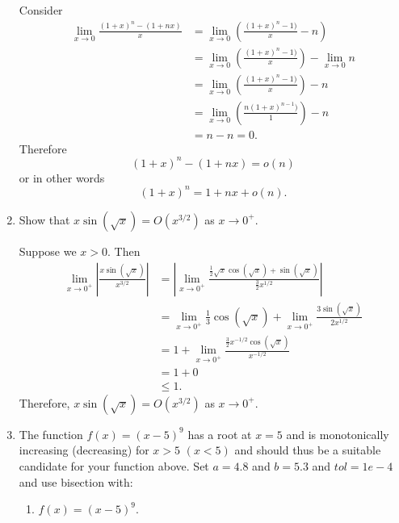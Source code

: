 \documentclass[a4paper,10pt]{article}
\newcommand{\abs}[1]{\left| #1 \right|}
\begin{document}
\begin{enumerate}[label = \arabic*.)]
             Consider 
             \begin{align*}
                \lim_{x \to 0} \frac{(1 + x)^n - (1 + nx)}{x} &= \lim_{x \to 0}  \left(\frac{(1 + x)^n - 1)}{x} - n\right) \\
                &= \lim_{x \to 0}  \left(\frac{(1 + x)^n - 1)}{x}\right) - \lim_{x \to 0}n \\
                &= \lim_{x \to 0}  \left(\frac{(1 + x)^n - 1)}{x}\right) - n \\
                &= \lim_{x \to 0}  \left(\frac{n(1 + x)^{n-1})}{1}\right) - n \\
                &= n - n = 0.
             \end{align*}
            Therefore
            \[
                (1 + x)^n - (1 + nx) = o(n)
            \]
            or in other words
            \[
                (1 + x)^n = 1 + nx + o(n).
            \]
            
            \item Show that $ x \sin (\sqrt{x}) = O(x^{3/2}) $ as $x \to 0^+$.
            
            Suppose we $ x > 0 $. Then
            \begin{align*}
                \lim_{x \to 0^+}\abs{\frac{x \sin( \sqrt{x})}{x^{3/2}}} &= \abs{\lim_{x \to 0^+} \frac{\frac{1}{2}\sqrt{x}\cos(\sqrt{x}) + \sin(\sqrt{x})}{\frac{3}{2} x^{1/2}}} \\
                &= \lim_{x \to 0^+} \frac{1}{3} \cos(\sqrt{x}) + \lim_{x \to 0^+}\frac{3 \sin(\sqrt{x})}{2x^{1/2}} \\
                &= 1 + \lim_{x \to 0^+} \frac{\frac{3}{2}x^{-1/2} \cos(\sqrt{x})}{x^{-1/2}} \\
                &= 1 + 0 \\
                &\leq 1.
            \end{align*}
            Therefore, $ x \sin (\sqrt{x}) = O(x^{3/2}) $ as $ x \to 0^+ $.
            
            \item The function $f(x) = (x - 5)^9$ has a root at $x = 5$ and is monotonically increasing (decreasing) for $x > 5$ $(x < 5)$ and should thus be a suitable candidate for your function above. Set $a = 4.8$ and $b = 5.3$ and $tol = 1e-4$ and use bisection with:
                \begin{enumerate}[label = \roman*.]
                    \item $f(x) = (x - 5)^9$.
                    

\end{enumerate}
\end{enumerate}
\end{document}

